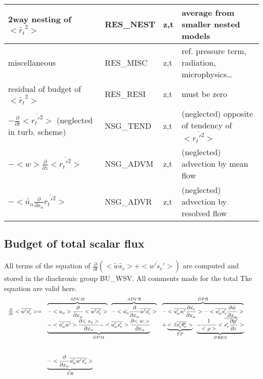\begin{longtable}[c]{|p{}|p{}|p{}|p{}|}
{\rm 2way nesting of }$<\tilde{r_t}^2>$                                & RES\_NEST  & z,t & average from smaller nested models \\\hline
{\rm miscellaneous}                                                    & RES\_MISC  & z,t & ref. pressure term, radiation, microphysics\ldots \\\hline
{\rm residual of budget of} $<\tilde{r_t}^2>$                          & RES\_RESI  & z,t & must be zero \\\hline
$-\frac{\partial }{\partial t}<\overline{r_t'^2}>$ (neglected in turb. scheme) & NSG\_TEND & z,t & (neglected) opposite of tendency of $<\overline{r_t'^2}>$ \\\hline
$-<w>\frac{\partial}{\partial z}<\overline{r_t'^2}>$                   & NSG\_ADVM  & z,t & (neglected) advection by mean flow\\\hline
$-<\tilde{u_\alpha}\frac{\partial}{\partial x_\alpha}\overline{r_t'^2}>$  & NSG\_ADVR & z,t & (neglected) advection by resolved flow\\\hline
\end{longtable}


\subsection{Budget of total scalar flux}


All terms of the equation of $\frac{\partial}{\partial t} (<\tilde{w}\tilde{s_v}> + <\overline{w's_v'}>)$ are
computed and stored in the diachronic group BU\_WSV. 
All comments made for the total Tke equation are valid here.\\

\begin{displaymath}
\left.
\begin{array}{rllll}
\frac{\partial }{\partial t} <\overline{w's_v'}> = & 
\overbrace{- <u_\alpha>\frac{\partial}{\partial x_\alpha} <\overline{w's_v'}> }^{ADVM} \;\;
\overbrace{- <\tilde{u_\alpha}\frac{\partial}{\partial x_\alpha} \overline{w's_v'} > }^{ADVR} &
\overbrace{- <\overline{u'_\alpha w'} \frac{\partial {\tilde{s_v}}}{\partial x_\alpha}>
- <\overline{u'_\alpha s_v'} \frac{\partial {\tilde{w}}}{\partial x_\alpha}>}^{DPR}&\\
\vspace*{1.0cm}
& \underbrace{- <\overline{u_\alpha'w'}> \frac{\partial {<s_v>}}{\partial x_\alpha}
- <\overline{u'_\alpha s_v'}> \frac{\partial {<w>}}{\partial x_\alpha}}_{DPM}&
+ \underbrace{<\beta  \overline{s_v'\theta'_v}>}_{TP} \;\; \underbrace{- \frac{1}{<\rho>}<\overline{s_v' \frac{\partial p'}{\partial z}}>}_{PRES}&\\
&\underbrace{- <\frac{\partial}{\partial x_\alpha} \overline{u'_\alpha w's_v'}>}_{TR}&&& \\
\end{array}
\right.
\end{displaymath}

